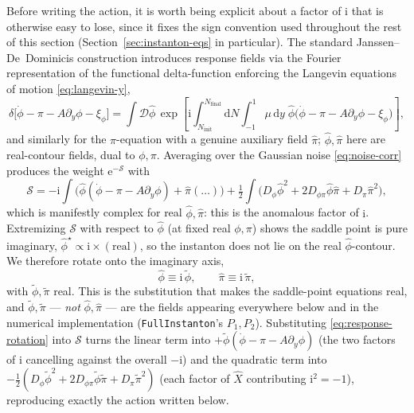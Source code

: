 \documentclass[a4paper,11pt]{article}
\renewcommand{\d}{\mathrm{d}}
\newcommand{\e}[1]{\mathrm{e}^{{#1}}}
\newcommand{\im}{\mathrm{i}}
\newcommand{\Dm}[1]{\mathcal{D}#1}            %
\newcommand{\Ny}{N}                          %
\newcommand{\Ninit}{N_{\mathrm{init}}}       %
\newcommand{\Nfinal}{N_{\mathrm{final}}}     %
\newcommand{\field}{\phi}                    %
\newcommand{\mom}{\pi}                       %
\newcommand{\noise}[1]{\xi_{#1}}             %
\newcommand{\rfield}{\widetilde\field}       %
\newcommand{\rmom}{\widetilde\mom}           %
\newcommand{\yco}{y}                         %
\newcommand{\measure}{\mu}                   %
\newcommand{\advcoef}{A}                     %
\newcommand{\Dnoise}[1]{D_{#1}}              %
\begin{document}
Before writing the action, it is worth being explicit about a factor of
$\im$ that is otherwise easy to lose, since it fixes the sign convention
used throughout the rest of this section (Section~\ref{sec:instanton-eqs}
in particular). The standard Janssen--De~Dominicis construction introduces
response fields via the Fourier representation of the functional
delta-function enforcing the Langevin equations of motion
\eqref{eq:langevin-y},
\begin{equation}
    \delta\big[\dot\field-\mom-\advcoef\partial_\yco\field-\noise{\field}\big]
    =
    \int \Dm{\hat\field} \,
    \exp\!\left[\im\!\int_{\Ninit}^{\Nfinal}\!\!\d\Ny\int_{-1}^1\!\measure\,\d\yco\;
    \hat\field\big(\dot\field-\mom-\advcoef\partial_\yco\field-\noise{\field}\big)\right] ,
\end{equation}
and similarly for the $\mom$-equation with a genuine auxiliary field
$\hat\mom$; $\hat\field,\hat\mom$ here are real-contour fields, dual to
$\field,\mom$. Averaging over the Gaussian noise
\eqref{eq:noise-corr} produces the weight $\e{-\mathcal S}$ with
\begin{equation}
    \mathcal S
    =
    -\im\!\int\!\big(\hat\field(\dot\field-\mom-\advcoef\partial_\yco\field)
    + \hat\mom(\ldots)\big)
    +
    \tfrac12\!\int\!\big(\Dnoise{\field}\hat\field^2 + 2\Dnoise{\field\mom}\hat\field\hat\mom + \Dnoise{\mom}\hat\mom^2\big) ,
\end{equation}
which is manifestly complex for real $\hat\field,\hat\mom$: this is the
anomalous factor of $\im$. Extremizing $\mathcal S$ with respect to
$\hat\field$ (at fixed real $\field,\mom$) shows the saddle point is pure
imaginary, $\hat\field^\star\propto\im\times(\text{real})$, so the
instanton does not lie on the real $\hat\field$-contour. We therefore
rotate onto the imaginary axis,
\begin{equation}
    \hat\field \equiv \im\,\rfield , \qquad \hat\mom \equiv \im\,\rmom ,
    \label{eq:response-rotation}
\end{equation}
with $\rfield,\rmom$ real. This is the substitution that makes the
saddle-point equations real, and $\rfield,\rmom$ --- \emph{not}
$\hat\field,\hat\mom$ --- are the fields appearing everywhere below and in
the numerical implementation (\texttt{FullInstanton}'s $P_1,P_2$).
Substituting \eqref{eq:response-rotation} into $\mathcal S$ turns the
linear term into $+\rfield(\dot\field-\mom-\advcoef\partial_\yco\field)$
(the two factors of $\im$ cancelling against the overall $-\im$) and the
quadratic term into
$-\tfrac12(\Dnoise{\field}\rfield^2+2\Dnoise{\field\mom}\rfield\rmom+\Dnoise{\mom}\rmom^2)$
(each factor of $\hat X$ contributing $\im^2=-1$), reproducing exactly the
action written below.
\end{document}
